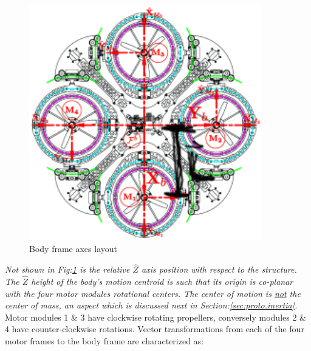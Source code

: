 \begin{figure}[htbp]
\centering
\includegraphics[width=0.9\textwidth]{figs/body-frame}
\caption{Body frame axes layout}
\label{fig:body-frame}
\end{figure}
\par
\emph{\color{Gray}Not shown in Fig:\ref{fig:body-frame} is the relative $\hat{Z}$ axis position with respect to the structure. The $\hat{Z}$ height of the body's motion centroid is such that its origin is co-planar with the four motor modules rotational centers. The center of motion is \underline{not} the center of mass, an aspect which is discussed next in Section:\ref{sec:proto.inertia}.}
\\
Motor modules 1 \& 3 have clockwise rotating propellers, conversely modules 2 \& 4 have counter-clockwise rotations. Vector transformations from each of the four motor frames to the body frame are characterized as:
